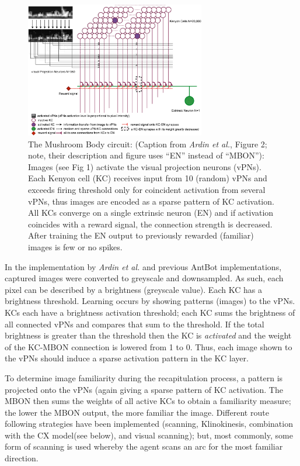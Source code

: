 \documentclass[a4paper,11pt,twoside,openright]{article}
\begin{document}
\begin{figure}
  \centering
  \includegraphics[width=0.7\textwidth]{Ardin2010MBModel}
  \caption{\label{fig:mb} The Mushroom Body circuit: (Caption from
    \textit{Ardin et al.}, Figure 2; note, their description and figure uses
    ``EN'' instead of ``MBON''): Images (see Fig 1) activate the visual
    projection neurons (vPNs). Each Kenyon cell (KC) receives input from 10
    (random) vPNs and exceeds firing threshold only for coincident activation
    from several vPNs, thus images are encoded as a sparse pattern of KC
    activation. All KCs converge on a single extrinsic neuron (EN) and if
    activation coincides with a reward signal, the connection strength is
    decreased. After training the EN output to previously rewarded (familiar)
    images is few or no spikes.}
\end{figure}

In the implementation by \textit{Ardin et al.}
and previous AntBot implementations, captured images were converted to greyscale
and downsampled\cite{Ardin2016, Eberding2016, Zhang2017, Mitchell2018}. As such,
each pixel can be described by a brightness (greyscale value). Each KC has
a brightness threshold. Learning occurs by showing patterns (images) to the vPNs.
KCs each have a brightness activation threshold; each KC sums the brightness of
all connected vPNs and compares that sum to the threshold. If the total
brightness is greater than the threshold then the KC is \textit{activated} and
the weight of the KC-MBON connection is lowered from 1 to 0. Thus, each image
shown to the vPNs should induce a sparse activation pattern in the KC layer.
\newline
\par

To determine image familiarity during the recapitulation process, a pattern is
projected onto the vPNs (again giving a sparse pattern of KC activation.
The MBON then sums the weights of all active KCs to obtain a familiarity measure;
the lower the MBON output, the more familiar the image. Different route following
strategies have been implemented (scanning\cite{Ardin2016, Eberding2016,
  Zhang2017}, Klinokinesis\cite{Zhang2017}, combination with the CX
model\cite{Zhang2017}(see below), and visual scanning\cite{Mitchell2018}); but,
most commonly, some form of scanning is used whereby the agent scans an arc for
the most familiar direction.
\newline
\par
\end{document}
